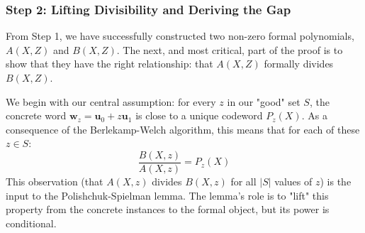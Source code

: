 \documentclass{article}
\begin{document}









\subsubsection{Step 2: Lifting Divisibility and Deriving the Gap}
From Step 1, we have successfully constructed two non-zero formal polynomials, $A(X,Z)$ and $B(X,Z)$. The next, and most critical, part of the proof is to show that they have the right relationship: that $A(X,Z)$ formally divides $B(X,Z)$.

We begin with our central assumption: for every $z$ in our "good" set $S$, the concrete word $\mathbf{w}_z = \mathbf{u}_0 + z\mathbf{u}_1$ is close to a unique codeword $P_z(X)$. As a consequence of the Berlekamp-Welch algorithm, this means that for each of these $z \in S$:
\[ \frac{B(X,z)}{A(X,z)} = P_z(X) \]
This observation (that $A(X,z)$ divides $B(X,z)$ for all $|S|$ values of $z$) is the input to the Polishchuk-Spielman lemma. The lemma's role is to "lift" this property from the concrete instances to the formal object, but its power is conditional.
\end{document}
